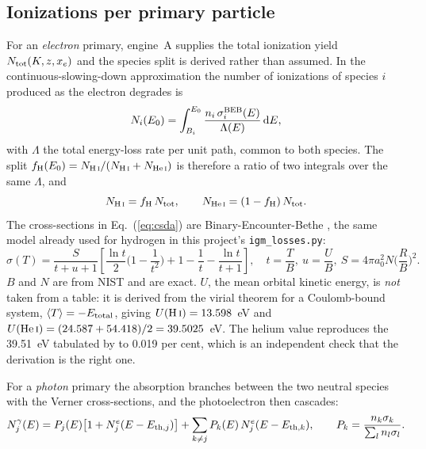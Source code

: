 \documentclass[11pt,a4paper]{article}
\begin{document}
\subsection{Ionizations per primary particle}
For an \emph{electron} primary, engine~A supplies the total ionization yield
$N_{\rm tot}(K,z,x_e)$ and the species split is derived rather than assumed.
In the continuous-slowing-down approximation the number of ionizations of
species $i$ produced as the electron degrades is
\begin{equation}
  N_i(E_0) = \int_{B_i}^{E_0}
             \frac{n_i\,\sigma_i^{\rm BEB}(E)}{\Lambda(E)}\,{\rm d}E ,
  \label{eq:csda}
\end{equation}
with $\Lambda$ the total energy-loss rate per unit path, common to both
species.  The split
$f_{\rm H}(E_0)=N_{\rm H\,\textsc{i}}/(N_{\rm H\,\textsc{i}}+N_{\rm He\,\textsc{i}})$
is therefore a ratio of two integrals over the same $\Lambda$, and
\begin{equation}
  N_{\rm H\,\textsc{i}} = f_{\rm H}\,N_{\rm tot},\qquad
  N_{\rm He\,\textsc{i}} = (1-f_{\rm H})\,N_{\rm tot}.
\end{equation}
The cross-sections in Eq.~(\ref{eq:csda}) are Binary-Encounter-Bethe
\citep{KimRudd1994}, the same model already used for hydrogen in this
project's \texttt{igm\_losses.py}:
\begin{equation}
  \sigma(T) = \frac{S}{t+u+1}
  \left[\frac{\ln t}{2}\Big(1-\frac{1}{t^2}\Big) + 1 - \frac 1t
        - \frac{\ln t}{t+1}\right],
  \quad t=\frac TB,\ u=\frac UB,\ S = 4\pi a_0^2 N \Big(\frac RB\Big)^2 .
\end{equation}
$B$ and $N$ are from NIST and are exact.  $U$, the mean orbital kinetic
energy, is \emph{not} taken from a table: it is derived from the virial
theorem for a Coulomb-bound system, $\langle T\rangle = -E_{\rm total}$,
giving $U({\rm H\,\textsc{i}}) = 13.598$~eV and
$U({\rm He\,\textsc{i}}) = (24.587+54.418)/2 = 39.5025$~eV.  The helium value
reproduces the 39.51~eV tabulated by \citet{KimRudd1994} to 0.019 per cent,
which is an independent check that the derivation is the right one.

For a \emph{photon} primary the absorption branches between the two neutral
species with the Verner cross-sections, and the photoelectron then cascades:
\begin{equation}
  N_j^\gamma(E) = P_j(E)\big[1 + N_j^e(E - E_{{\rm th},j})\big]
                + \sum_{k\ne j} P_k(E)\, N_j^e(E - E_{{\rm th},k}),
  \qquad
  P_k = \frac{n_k\sigma_k}{\sum_l n_l\sigma_l}.
  \label{eq:phyield}
\end{equation}
\end{document}
